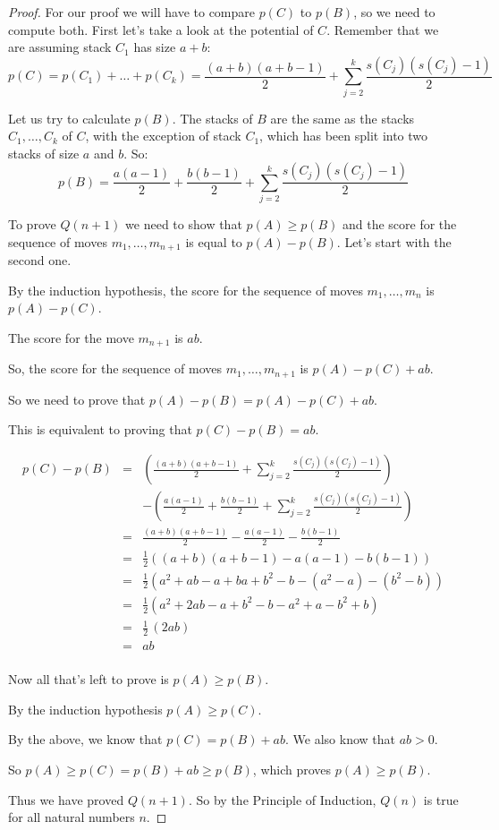\documentclass[14pt]{extarticle}
\begin{document}
\begin{proof}
For our proof we will have to compare $p(C)$ to $p(B)$, so we need to compute both. First let's take a look at the potential of $C$. Remember that we are assuming stack $C_1$ has size $a+b$:
$$
p(C) = p(C_1) + \ldots + p(C_k) = \frac{(a+b)(a+b-1)}{2} + \sum_{j = 2}^k \frac{s(C_j)(s(C_j) - 1)}{2}
$$

Let us try to calculate $p(B)$. The stacks of $B$ are the same as the stacks $C_1, \ldots, C_k$ of $C$, with the exception of stack $C_1$, which has been split into two stacks of size $a$ and $b$. So:
$$
p(B) = \frac{a(a-1)}{2} + \frac{b(b-1)}{2} + \sum_{j = 2}^k \frac{s(C_j)(s(C_j) - 1)}{2}
$$

To prove $Q(n+1)$ we need to show that $p(A) \geq p(B)$ and the score for the sequence of moves $m_1, \ldots, m_{n+1}$ is equal to $p(A) - p(B)$. Let's start with the second one.

By the induction hypothesis, the score for the sequence of moves $m_1, \ldots, m_n$ is $p(A) - p(C)$.

The score for the move $m_{n+1}$ is $ab$.

So, the score for the sequence of moves $m_1, \ldots, m_{n+1}$ is $p(A) - p(C) + ab$.

So we need to prove that $p(A) - p(B) = p(A) - p(C) + ab$. 

This is equivalent to proving that $p(C) - p(B) = ab$.

$$
\begin{array}{cccc}
p(C) - p(B) & = &\displaystyle \left( \frac{(a+b)(a+b-1)}{2} + \sum_{j = 2}^k \frac{s(C_j)(s(C_j) - 1)}{2}\right)\\
 &   &\displaystyle - \left(\frac{a(a-1)}{2} + \frac{b(b-1)}{2} + \sum_{j = 2}^k \frac{s(C_j)(s(C_j) - 1)}{2}\right) \\
 & = & \displaystyle \frac{(a+b)(a+b-1)}{2} - \frac{a(a-1)}{2} - \frac{b(b-1)}{2}\\
 & = &\displaystyle \frac{1}{2}((a + b)(a + b - 1) - a(a-1) - b(b-1)) \\
 & = &\displaystyle \frac{1}{2}(a^2 + ab - a + ba + b^2 - b - (a^2-a) - (b^2-b))\\
 & = &\displaystyle \frac{1}{2}(a^2 + 2ab - a + b^2 - b - a^2+a - b^2+b)\\
 & = &\displaystyle \frac{1}{2}\,(2ab)\\
 & = &\displaystyle ab\\
\end{array}
$$

Now all that's left to prove is $p(A) \geq p(B)$. 

By the induction hypothesis $p(A) \geq p(C)$. 

By the above, we know that $p(C) = p(B) + ab$. We also know that $ab > 0$. 

So $p(A) \geq p(C) = p(B) + ab \geq p(B)$, which proves $p(A) \geq p(B)$.

Thus we have proved $Q(n+1)$. So by the Principle of Induction, $Q(n)$ is true for all natural numbers $n$.
\end{proof}
\end{document}
